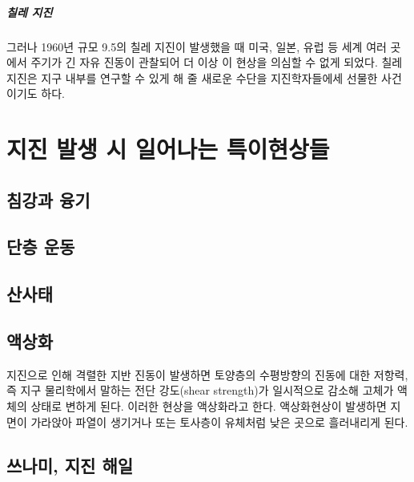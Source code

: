 \documentclass[12pt, a4paper, oneside]{book}
\begin{document}
	\paragraph{칠레 지진}
	그러나 1960년 규모 9.5의 칠레 지진이 발생했을 때 미국, 일본, 유럽 등 세계 여러 곳에서 주기가 긴 자유 진동이 관찰되어 더 이상 이 현상을 의심할 수 없게 되었다.
	칠레 지진은 지구 내부를 연구할 수 있게 해 줄 새로운 수단을 지진학자들에세 선물한 사건이기도 하다.
	
	
	
	\clearpage
	\chapter{지진 발생 시 일어나는 특이현상들 }
	
	
	\clearpage
	\section{침강과 융기}

	\section{단층 운동}
	
	
	\section{산사태}


	\clearpage
	\section{액상화}

	지진으로 인해 격렬한 지반 진동이 발생하면 토양층의 수평방향의 진동에 대한 저항력, 즉 지구 물리학에서 말하는 전단 강도(shear strength)가 일시적으로 감소해 고체가 액체의 상태로 변하게 된다.
	이러한 현상을 액상화라고 한다.
	액상화현상이 발생하면 지면이 가라앉아 파열이 생기거나 또는 토사층이 유체처럼 낮은 곳으로 흘러내리게 된다.
	
	\clearpage
	\section{쓰나미, 지진 해일}
	
\end{document}
